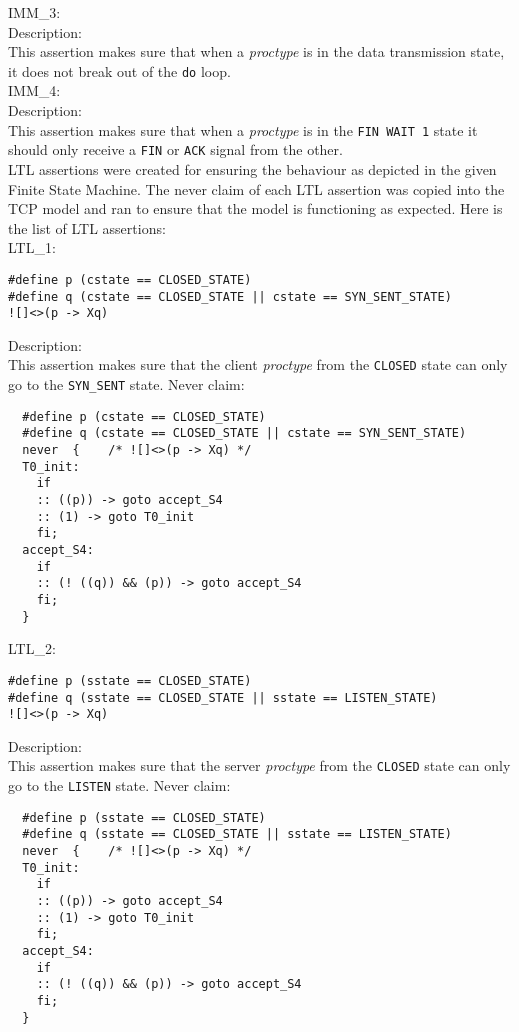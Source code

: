 \documentclass{WigReport}
\begin{document}
IMM\_3:\\
Description:\\
This assertion makes sure that when a \textit{proctype} is in the data transmission state, it does not break out of the \verb|do| loop.
\\

IMM\_4:\\
Description:\\
This assertion makes sure that when a \textit{proctype} is in the \verb|FIN WAIT 1| state it should only receive a \verb|FIN| or \verb|ACK| signal from the other.
\\

LTL assertions were created for ensuring the behaviour as depicted in the given Finite State Machine. The never claim of each LTL assertion was copied into the TCP model and ran to ensure that the model is functioning as expected. Here is the list of LTL assertions:
\\

LTL\_1:\\
\begin{verbatim}
#define p (cstate == CLOSED_STATE)
#define q (cstate == CLOSED_STATE || cstate == SYN_SENT_STATE)
![]<>(p -> Xq)
\end{verbatim}
Description:\\
This assertion makes sure that the client \textit{proctype} from the \verb|CLOSED| state can only go to the \verb|SYN_SENT| state.
Never claim:\\
\begin{verbatim}
  #define p (cstate == CLOSED_STATE)
  #define q (cstate == CLOSED_STATE || cstate == SYN_SENT_STATE)
  never  {    /* ![]<>(p -> Xq) */
  T0_init:
    if
    :: ((p)) -> goto accept_S4
    :: (1) -> goto T0_init
    fi;
  accept_S4:
    if
    :: (! ((q)) && (p)) -> goto accept_S4
    fi;
  }
\end{verbatim}

LTL\_2:\\
\begin{verbatim}
#define p (sstate == CLOSED_STATE)
#define q (sstate == CLOSED_STATE || sstate == LISTEN_STATE)
![]<>(p -> Xq)
\end{verbatim}
Description:\\
This assertion makes sure that the server \textit{proctype} from the \verb|CLOSED| state can only go to the \verb|LISTEN| state.
Never claim:\\
\begin{verbatim}
  #define p (sstate == CLOSED_STATE)
  #define q (sstate == CLOSED_STATE || sstate == LISTEN_STATE)
  never  {    /* ![]<>(p -> Xq) */
  T0_init:
    if
    :: ((p)) -> goto accept_S4
    :: (1) -> goto T0_init
    fi;
  accept_S4:
    if
    :: (! ((q)) && (p)) -> goto accept_S4
    fi;
  }
\end{verbatim}
\end{document}
